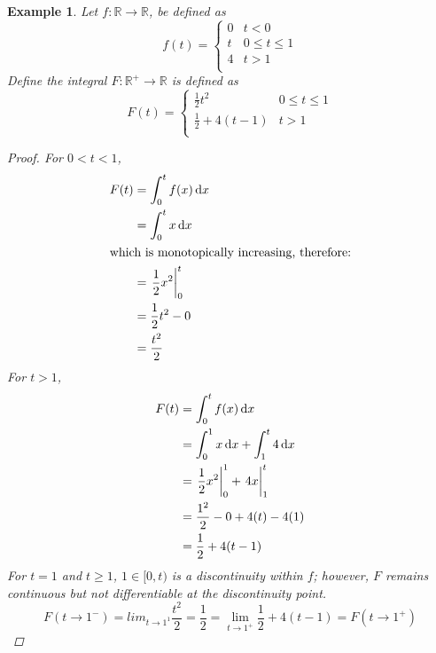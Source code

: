 \documentclass[]{article}
\newcommand{\R}{\mathbb{R}}
\newtheorem{example}{Example}
\begin{document}
\begin{example}
    Let $f : \R \to \R$, be defined as\[
        f(t) = \begin{cases}
            0 &t<0\\
            t &0 \leq t \leq 1\\
            4 &t>1\\
        \end{cases}
    \] Define the integral $F: \R^{+} \to \R$ is defined as\[
        F(t) = \begin{cases}
            \frac{1}{2} t^2 &0 \leq t \leq 1\\
            \frac{1}{2} + 4 (t - 1) &t>1\\
        \end{cases}
    \]
    \begin{proof}
        For $0<t<1$,
        \begin{align*}
            F(t) &= \int_{0}^{t} f(x) \dd{x}\\
                &= \int_{0}^{t} x \dd{x}\\
            \intertext{which is monotopically increasing, therefore:}
                &= \eval{\frac{1}{2} x^2}_{0}^{t}\\
                &= \frac{1}{2} t^2 - 0\\
                &= \frac{t^2}{2}
        \end{align*}
        For $t>1$,
        \begin{align*}
            F(t) &= \int_{0}^{t} f(x) \dd{x}\\
                &= \int_{0}^{1} x \dd{x} + \int_{1}^{t} 4 \dd{x}\\
                &= \eval{\frac{1}{2} x^2}_{0}^{1} + \eval{4 x}_{1}^{t}\\
                &= \frac{1^2}{2} - 0 + 4(t) - 4(1)\\
                &= \frac{1}{2} + 4(t - 1)
        \end{align*}
        For $t=1$ and $t\geq 1$, $1\in [0,t)$ is a discontinuity within $f$; 
        however, $F$ remains continuous but not differentiable at the discontinuity point.\[
            F(t \to 1^{-}) = lim_{t\to 1^{1}} \frac{t^2}{2} = \frac{1}{2} = \lim_{t\to1^{+}} \frac{1}{2} + 4(t-1) = F(t \to 1^{+})
        \] %
    \end{proof}
\end{example}
\end{document}
